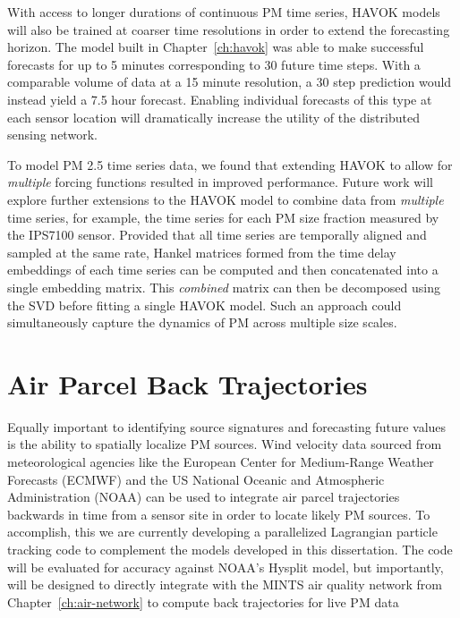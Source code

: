 With access to longer durations of continuous PM time series, HAVOK
models will also be trained at coarser time resolutions in order to extend the
forecasting horizon. The model built in Chapter~\ref{ch:havok} was able to
make successful forecasts for up to 5 minutes corresponding to 30 future time
steps. With a comparable volume of data at a 15 minute resolution, a 30 step
prediction would instead yield a 7.5 hour forecast. Enabling individual
forecasts of this type at each sensor location will dramatically increase the
utility of the distributed sensing network.

To model PM 2.5 time series data, we found that extending HAVOK to
allow for \textit{multiple} forcing functions resulted in improved performance.
Future work will explore further extensions to the HAVOK model to combine data from
\textit{multiple} time series, for example, the time series for each PM size
fraction measured by the IPS7100 sensor. Provided that all time series are
temporally aligned and sampled at the same rate, Hankel matrices formed from the time
delay embeddings of each time series can be computed and then concatenated into
a single embedding matrix. This \textit{combined} matrix can then be
decomposed using the SVD before fitting a single HAVOK model. Such an approach
could simultaneously capture the dynamics of PM across multiple size scales.

\section{Air Parcel Back Trajectories}

Equally important to identifying source signatures and forecasting future
values is the ability to spatially localize PM sources. Wind velocity
data sourced from meteorological agencies like the European Center for
Medium-Range Weather Forecasts (ECMWF) and the US National Oceanic and
Atmospheric Administration (NOAA) can be used to integrate air parcel trajectories
backwards in time from a sensor site in order to locate likely PM sources. To
accomplish, this we are currently developing a parallelized Lagrangian particle
tracking code to complement the models developed in this dissertation. The code
will be evaluated for accuracy against NOAA's Hysplit model, but importantly,
will be designed to directly integrate with the MINTS air quality network from
Chapter~\ref{ch:air-network} to compute back trajectories for live PM data

